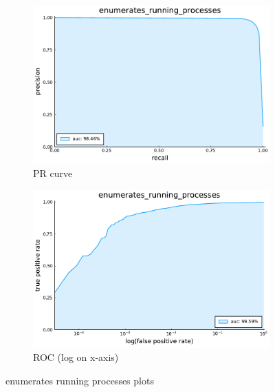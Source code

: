 \begin{figure}
    \centering
    \begin{subfigure}{.49\textwidth}
      \centering
      \includegraphics[width=1\linewidth]{pdfs/modperf/enumerates_running_processes.bson-pr.pdf}
      \caption{PR curve}
    \end{subfigure}
    \begin{subfigure}{.49\textwidth}
        \centering
        \includegraphics[width=1\linewidth]{pdfs/modperf/enumerates_running_processes.bson-roclog.pdf}
        \caption{ROC (log on x-axis)}
    \end{subfigure}
    \caption{enumerates running processes plots}
    \label{fig:fig}
\end{figure}

